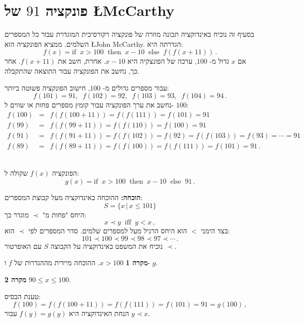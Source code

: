 %



\section{פונקציה $91$ של
\L{McCarthy}}

בסעיף זה נוכיח באינדוקציה תכונה מוזרה של פונקציה רקורסיבית המוגדרת עבור כל המספרים השלמים. ממציא הפונקציה הוא
\L{John McCarthy}.
הגדרתה היא:
\[
f(x) = \textrm{if}\;\; x > 100 \;\;\textrm{then}\;\; x - 10 \;\;\textrm{else}\;\; f(f(x+11))\,.
\]
אם 
$x$
גדול מ-%
$100$,
ערכה של הפונצקיה היא 
$x-10$.
אחרת, חשב את 
$f(x+11)$.
אחר כך, נחשב את הפונקציה עבור התוצאה שהתקבלה.


עבור מספרים גדולים מ-%
$100$,
חישוב הפונקציה פשוטה ביותר:
\[
f(101) = 91, \;\; f(102) = 92,\;\; f(103) = 93,\;\; f(104) = 94\,.
\]
נחשב את ערך הפונקציה עבור קומץ מספרים פחות או שווים  ל-%
$100$:
\begin{eqnarray*}
f(100) &=& f(f(100+11)) = f(f(111)) = f(101) = 91\\
f(99) &=& f(f(99+11)) = f(f(110)) = f(100) = 91\\
f(91) &=& f(f(91+11)) = f(f(102)) = f(92) = f(f(103)) = f(93) = \cdots = 91\\
f(89) &=& f(f(89+11)) = f(f(100)) = f(f(111)) = f(101) = 91\,.
\end{eqnarray*}

\begin{theorem}\mbox{}\\
הפונקציה
$f(x)$
שקולה ל:
\[
g(x) = \textrm{if}\;\; x > 100 \;\;\textrm{then}\;\; x - 10 \;\;\textrm{else}\;\; 91\,.
\]
\end{theorem}

\textbf{הוכחה:}
ההוכחה באינדוקציה מעל קבוצת המספרים:
\[
S=\{x\,|\,x\leq 101\}
\]
היחס "פחות מ"
$\prec$
מוגדר כך:
\[
x \prec y \;\; \textrm{iff}\;\; y < x\,,
\]
בצד הימני 
$<$
הוא היחס הרגיל מעל למספרים שלמים. סדר המספרים לפי
$\prec$
הוא:
\[
101 \prec 100 \prec 99 \prec 98 \prec 97 \prec \cdots\,.
\]
נוכיח את המשפט באינדוקציה על הקבוצה
$S$
עם האופרטור
$\prec$.

\noindent\textbf{מקרה 1}  $x > 100$.
ההוכחה מיידית מההגדרות של 
$f$
ו-
$g$.

\noindent\textbf{מקרה 2} 
$90\leq x \leq 100$.

\noindent{}%
טענת הבסיס:
\[
f(100) = f(f(100+11)) = f(f(111)) = f(101) = 91 = g(100)\,,
\]
הנחת האינדוקציה היא
$f(y) = g(y)$
עבור
$y\prec x$.

